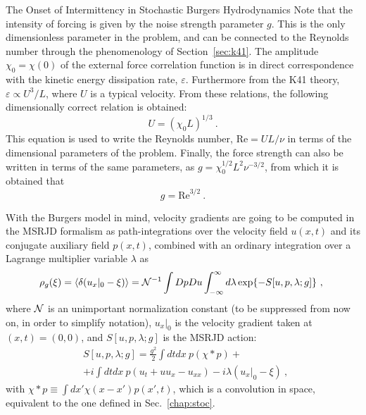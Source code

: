\begin{chapter}{The Onset of Intermittency in Stochastic Burgers Hydrodynamics}
Note that the intensity of forcing is given by the noise strength parameter $g$. This is the only dimensionless parameter in the problem, and can be connected to the Reynolds number through the phenomenology of Section~\ref{sec:k41}. The amplitude $\chi_0 = \chi(0)$ of the external force correlation function is in direct correspondence with the kinetic energy dissipation rate, $\varepsilon$. Furthermore from the K41 theory, $\varepsilon \propto U^3/L$, where $U$ is a typical velocity. From these relations, the following dimensionally correct relation is obtained:
\begin{equation}
    U = (\chi_0 L)^{1/3} \ .
\end{equation}
This equation is used to write the Reynolds number, $\mathrm{Re} = U L / \nu$ in terms of the dimensional parameters of the problem. Finally, the force strength can also be written in terms of the same parameters, as $g = \chi_0^{1/2} L^2 \nu^{-3/2}$, from which it is obtained that
\begin{equation}
    g = \mathrm{Re}^{3/2} \ .
\end{equation}


With the Burgers model in mind, velocity gradients are going to be computed in the MSRJD formalism as path-integrations over the velocity field
$u(x,t)$ and its conjugate auxiliary field $p(x,t)$, combined with an ordinary integration over a Lagrange multiplier
variable $\lambda$ as
\begin{equation}
\rho_g(\xi)  = \langle \delta(u_x|_0 - \xi) \rangle = {\cal{N}}^{-1} \int Dp Du \int_{- \infty}^{ \infty} d \lambda \exp \{ -S[u,p,\lambda ; g] \} \ , \
\label{vgPDF}
\end{equation}
where $\cal{N}$ is an unimportant normalization constant (to be suppressed from now on, in order to simplify notation), $u_x|_0$ is the velocity gradient taken at $(x,t) = (0,0)$, and $S[u,p,\lambda ; g]$ is the MSRJD action:
\begin{equation} \begin{split}
&S[u,p,\lambda ; g] = \frac{g^2}{2} \int d t d x ~ p (\chi * p ) + \\
&+i \int d t d x ~ p(u_t+u u_x - u_{xx}) - i\lambda (u_x |_0 - \xi ) \ , \ \label{msr_action}
\end{split} \end{equation}
with $\chi * p \equiv \int dx'\chi(x-x') p(x',t)$, which is a convolution in space, equivalent to the one defined in Sec.~\ref{chap:stoc}.


\end{chapter}
